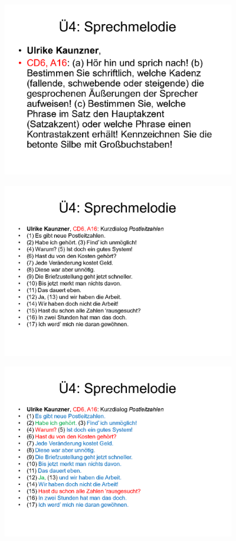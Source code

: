 \documentclass[
  letterpaper,
]{scrbook}
\begin{document}
\includegraphics[width=4in,height=\textheight]{./pictures/sprachlabor/Phonetikuebungen_S01_Page13.png}

\includegraphics[width=4in,height=\textheight]{./pictures/sprachlabor/Phonetikuebungen_S01_Page14.png}

\includegraphics[width=4in,height=\textheight]{./pictures/sprachlabor/Phonetikuebungen_S01_Page15.png}
\end{document}
